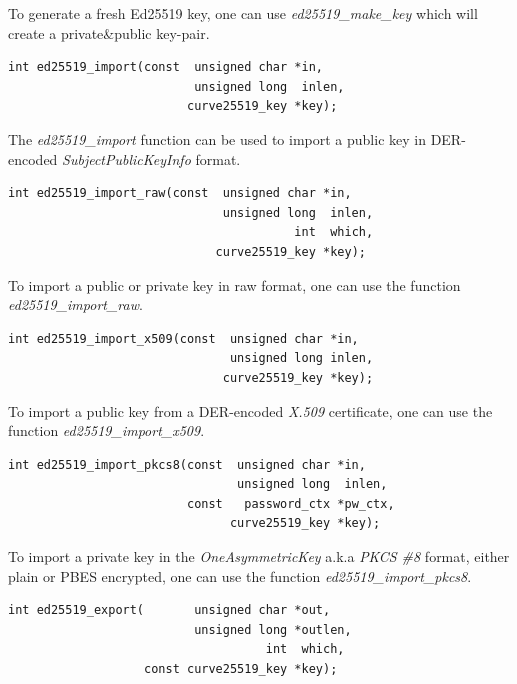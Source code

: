 \documentclass[synpaper]{book}
\begin{document}
To generate a fresh Ed25519 key, one can use \textit{ed25519\_make\_key} which will create a private\&public key-pair.

\begin{verbatim}
int ed25519_import(const  unsigned char *in,
                          unsigned long  inlen,
                         curve25519_key *key);
\end{verbatim}

The \textit{ed25519\_import} function can be used to import a public key in DER-encoded \textit{SubjectPublicKeyInfo} format.

\begin{verbatim}
int ed25519_import_raw(const  unsigned char *in,
                              unsigned long  inlen,
                                        int  which,
                             curve25519_key *key);
\end{verbatim}

To import a public or private key in raw format, one can use the function \textit{ed25519\_import\_raw}.

\begin{verbatim}
int ed25519_import_x509(const  unsigned char *in,
                               unsigned long inlen,
                              curve25519_key *key);
\end{verbatim}

To import a public key from a DER-encoded \textit{X.509} certificate, one can use the function \textit{ed25519\_import\_x509}.

\begin{verbatim}
int ed25519_import_pkcs8(const  unsigned char *in,
                                unsigned long  inlen,
                         const   password_ctx *pw_ctx,
                               curve25519_key *key);
\end{verbatim}

To import a private key in the \textit{OneAsymmetricKey} a.k.a \textit{PKCS \#8} format, either plain or PBES encrypted,
one can use the function \textit{ed25519\_import\_pkcs8}.

\begin{verbatim}
int ed25519_export(       unsigned char *out,
                          unsigned long *outlen,
                                    int  which,
                   const curve25519_key *key);
\end{verbatim}
\end{document}
